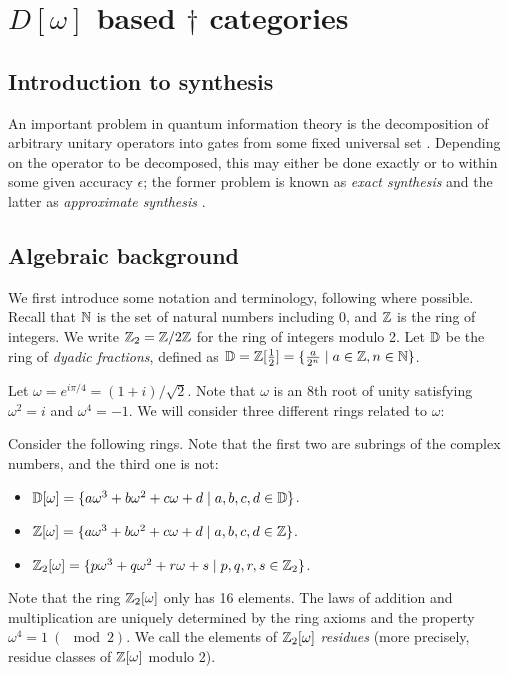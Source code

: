 \chapter{$D[\omega]$ based $\dagger$ categories} %
\label{cha:d_omega_based_dagger_categories}

\section{Introduction to synthesis} %
\label{sec:introduction_to_synthesis}
An important problem in quantum information theory is the decomposition of arbitrary unitary
operators into gates from some fixed universal set {\cite{neilsen2000:QuantumComputationAndInfo}}.
Depending on the operator to be decomposed, this may either be done exactly or to within some given
accuracy $\epsilon$; the former problem is known as {\em exact synthesis} and the latter as {\em
approximate synthesis} {\cite{Kliuchnikov-et-al}}.

\section{Algebraic background} %
\label{sec:algebraic_background}

We first introduce some notation and terminology, following {\cite{Kliuchnikov-et-al}} where
possible. Recall that $\mathbb{N}$ is the set of natural numbers including 0, and $\mathbb{Z}$ is the ring of
\linebreak integers. We write $\mathbb{Z}_2=\mathbb{Z}/2\mathbb{Z}$ for the ring of integers modulo 2. Let $\mathbb{D}$ be the ring
of {\em dyadic fractions}, defined as $\mathbb{D} = \mathbb{Z}[\frac12] = \{\frac{a}{2^n}\mid a\in\mathbb{Z}, n\in\mathbb{N}\}$.

Let $\omega = e^{i\pi/4} = (1+i)/\sqrt{2}$. Note that $\omega$ is an 8th root of unity satisfying
$\omega^2=i$ and $\omega^4=-1$. We will consider three different rings related to $\omega$:

\begin{definition}
  Consider the following rings. Note that the first two are subrings of the complex numbers, and
  the third one is not:
  \begin{itemize}
    \item $\mathbb{D}[\omega] = \{a\omega^3+b\omega^2+c\omega+d \mid a,b,c,d\in\mathbb{D}\}$.
    \item $\mathbb{Z}[\omega] = \{a\omega^3+b\omega^2+c\omega+d \mid a,b,c,d\in\mathbb{Z}\}$.
    \item $\mathbb{Z}_2[\omega] = \{p\omega^3+q\omega^2+r\omega+s \mid p,q,r,s\in\mathbb{Z}_2\}$.
  \end{itemize}
  Note that the ring $\mathbb{Z}_2[\omega]$ only has 16 elements. The laws of addition and multiplication are
  uniquely determined by the ring axioms and the property $\omega^4=1\ (\mod 2)$. We call the
  elements of $\mathbb{Z}_2[\omega]$ {\em residues} (more precisely, residue classes of $\mathbb{Z}[\omega]$ modulo 2).
\end{definition}

